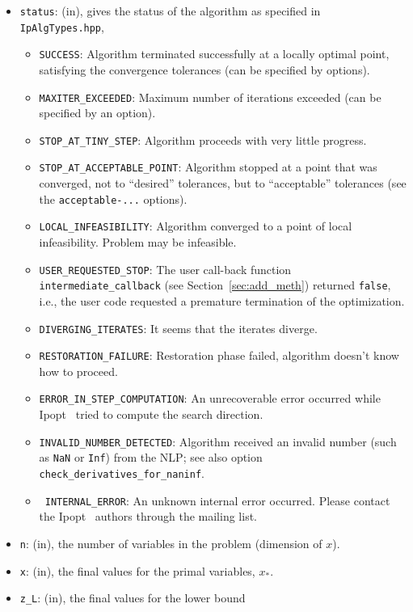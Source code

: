 \documentclass[10pt]{article}
\newcommand{\Ipopt}{{\sc Ipopt }}
\begin{document}
\begin{itemize}
\item {\tt status}: (in), gives the status of the algorithm as
  specified in {\tt IpAlgTypes.hpp},
  \begin{itemize}
  \item {\tt SUCCESS}: Algorithm terminated successfully at a locally
    optimal point, satisfying the convergence tolerances (can be
    specified by options).
  \item {\tt MAXITER\_EXCEEDED}: Maximum number of iterations exceeded
    (can be specified by an option).
  \item {\tt STOP\_AT\_TINY\_STEP}: Algorithm proceeds with very
    little progress.
  \item {\tt STOP\_AT\_ACCEPTABLE\_POINT}: Algorithm stopped at a
    point that was converged, not to ``desired'' tolerances, but to
    ``acceptable'' tolerances (see the {\tt acceptable-...} options).
  \item {\tt LOCAL\_INFEASIBILITY}: Algorithm converged to a point of
    local infeasibility. Problem may be infeasible.
  \item {\tt USER\_REQUESTED\_STOP}: The user call-back function {\tt
      intermediate\_callback} (see Section~\ref{sec:add_meth})
    returned {\tt false}, i.e., the user code requested a premature
    termination of the optimization.
  \item {\tt DIVERGING\_ITERATES}: It seems that the iterates diverge.
  \item {\tt RESTORATION\_FAILURE}: Restoration phase failed,
    algorithm doesn't know how to proceed.
  \item {\tt ERROR\_IN\_STEP\_COMPUTATION}: An unrecoverable error
    occurred while \Ipopt\ tried to compute the search direction.
  \item {\tt INVALID\_NUMBER\_DETECTED}:  Algorithm received an
    invalid number (such as {\tt NaN} or {\tt Inf}) from the NLP; see
    also option {\tt check\_derivatives\_for\_naninf}.
  \item {\tt
      INTERNAL\_ERROR}: An unknown internal error occurred.  Please
    contact the \Ipopt\ authors through the mailing list.
  \end{itemize}
\item {\tt n}: (in), the number of variables in the problem (dimension
  of $x$).
\item {\tt x}: (in), the final values for the primal variables, $x_*$.
\item {\tt z\_L}: (in), the final values for the lower bound

\end{itemize}
\end{document}
